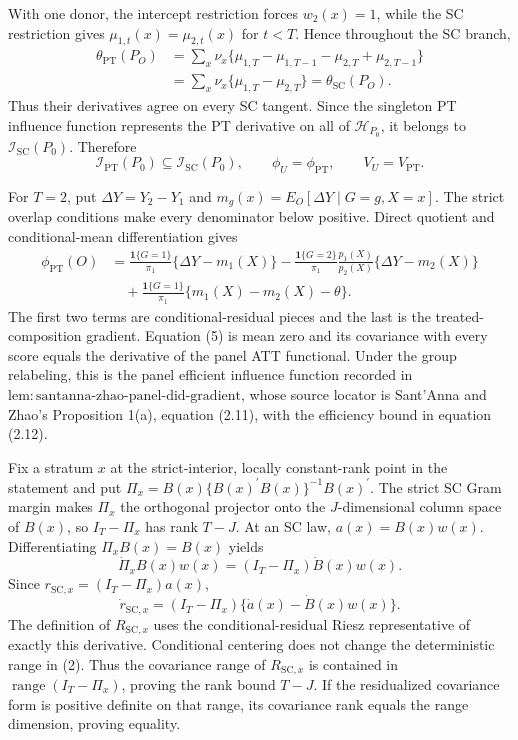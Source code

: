 With one donor, the intercept restriction forces \(w_2(x)=1\), while the SC restriction gives \(\mu_{1,t}(x)=\mu_{2,t}(x)\) for \(t<T\).  Hence throughout the SC branch,
\[
 \begin{aligned}
 \theta_{\mathrm{PT}}(P_O)
 &=\sum_x\nu_x\{\mu_{1,T}-\mu_{1,T-1}-\mu_{2,T}+\mu_{2,T-1}\}\\
 &=\sum_x\nu_x\{\mu_{1,T}-\mu_{2,T}\}
 =\theta_{\mathrm{SC}}(P_O).
 \end{aligned}
 \tag{3}
\]
Thus their derivatives agree on every SC tangent.  Since the singleton PT influence function represents the PT derivative on all of \(\mathcal H_{P_0}\), it belongs to \(\mathcal I_{\mathrm{SC}}(P_0)\).  Therefore
\[
 \mathcal I_{\mathrm{PT}}(P_0)\subseteq\mathcal I_{\mathrm{SC}}(P_0),
 \qquad
 \phi_U=\phi_{\mathrm{PT}},
 \qquad
 V_U=V_{\mathrm{PT}}.
 \tag{4}
\]

For \(T=2\), put \(\Delta Y=Y_2-Y_1\) and \(m_g(x)=E_O[\Delta Y\mid G=g,X=x]\).  The strict overlap conditions make every denominator below positive.  Direct quotient and conditional-mean differentiation gives
\[
 \begin{aligned}
 \phi_{\mathrm{PT}}(O)
 &=\frac{\mathbf 1\{G=1\}}{\pi_1}\{\Delta Y-m_1(X)\}
 -\frac{\mathbf 1\{G=2\}}{\pi_1}\frac{p_1(X)}{p_2(X)}\{\Delta Y-m_2(X)\}\\
 &\quad+\frac{\mathbf 1\{G=1\}}{\pi_1}\{m_1(X)-m_2(X)-\theta\}.
 \end{aligned}
 \tag{5}
\]
The first two terms are conditional-residual pieces and the last is the treated-composition gradient.  Equation (5) is mean zero and its covariance with every score equals the derivative of the panel ATT functional.  Under the group relabeling, this is the panel efficient influence function recorded in \(\mathrm{lem{:}santanna\text{-}zhao\text{-}panel\text{-}did\text{-}gradient}\), whose source locator is Sant'Anna and Zhao's Proposition 1(a), equation (2.11), with the efficiency bound in equation (2.12).

Fix a stratum \(x\) at the strict-interior, locally constant-rank point in the statement and put \(\Pi_x=B(x)\{B(x)^{\prime}B(x)\}^{-1}B(x)^{\prime}\).  The strict SC Gram margin makes \(\Pi_x\) the orthogonal projector onto the \(J\)-dimensional column space of \(B(x)\), so \(I_T-\Pi_x\) has rank \(T-J\).  At an SC law, \(a(x)=B(x)w(x)\).  Differentiating \(\Pi_xB(x)=B(x)\) yields
\[
 \dot\Pi_xB(x)w(x)=(I_T-\Pi_x)\dot B(x)w(x).
 \tag{1}
\]
Since \(r_{\mathrm{SC},x}=(I_T-\Pi_x)a(x)\),
\[
 \dot r_{\mathrm{SC},x}
 =(I_T-\Pi_x)\{\dot a(x)-\dot B(x)w(x)\}.
 \tag{2}
\]
The definition of \(R_{\mathrm{SC},x}\) uses the conditional-residual Riesz representative of exactly this derivative.  Conditional centering does not change the deterministic range in (2).  Thus the covariance range of \(R_{\mathrm{SC},x}\) is contained in \(\operatorname{range}(I_T-\Pi_x)\), proving the rank bound \(T-J\).  If the residualized covariance form is positive definite on that range, its covariance rank equals the range dimension, proving equality.

